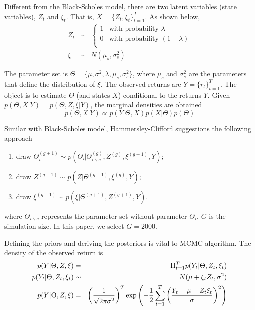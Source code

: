 \documentclass[11pt,reqno,final]{amsart}
\def\exp{\hbox{\rm exp}}
\begin{document}
Different from the Black-Scholes model, there are two latent variables (state variables), $Z_t$ and $\xi_t$. That is, $X = \{Z_t, \xi_t\}_{t=1}^{T}$. As shown below,
\begin{eqnarray*}
Z_t &\sim&
\left\{
  \begin{array}{lc}
    1 & \textrm{with probability } \lambda \\
    0 & \textrm{with probability } (1-\lambda) \\
  \end{array}
\right. \\
\xi &\sim& N(\mu_s, \sigma_s^2)
\end{eqnarray*}

The parameter set is $\Theta=\{\mu, \sigma^2, \lambda, \mu_s, \sigma_s^2\}$, where $\mu_s$ and $\sigma_s^2$ are the parameters that define the distribution of $\xi$. The observed returns are $Y=\{r_t\}_{t=1}^T$. The object is to estimate $\Theta$ (and states $X$) conditional to the returns $Y$. Given $p(\Theta, X|Y) = p(\Theta, Z, \xi|Y)$, the marginal densities are obtained
$$
p(\Theta, X|Y) \propto p(Y|\Theta,X)p(X|\Theta)p(\Theta)
$$

Similar with Black-Scholes model, Hammersley-Clifford suggestions the following approach
\begin{enumerate}
    \item draw $\Theta_i^{(g+1)} \sim p(\Theta_i|\Theta_{i \backslash c}^{(g)} ,Z^{(g)}, \xi^{(g+1)}, Y)$;
    \item draw $Z^{(g+1)} \sim p(Z|\Theta^{(g+1)}, \xi^{(g)}, Y)$;
    \item draw $\xi^{(g+1)} \sim p(\xi|\Theta^{(g+1)}, Z^{(g+1)}, Y)$.
\end{enumerate}
where $\Theta_{i \backslash c}$ represents the parameter set without parameter $\Theta_i$. $G$ is the simulation size. In this paper, we select $G=2000$.

Defining the priors and deriving the posteriors is vital to MCMC algorithm. The density of the observed return is
\begin{eqnarray*}
p(Y|\Theta, Z, \xi) &=& \Pi_{t=1}^T p(Y_t|\Theta, Z_t, \xi_t) \\
p(Y_t|\Theta, Z_t, \xi_t) &\sim& N(\mu+\xi_tZ_t, \sigma^2) \\
p(Y|\Theta, Z, \xi) &=&  \left( \frac{1}{\sqrt{2\pi\sigma^2}} \right)^T \exp\left( -\frac{1}{2} \sum_{t=1}^{T} \left( \frac{Y_t - \mu - Z_t \xi_t}{\sigma}\right)^2 \right)
\end{eqnarray*}
\end{document}
